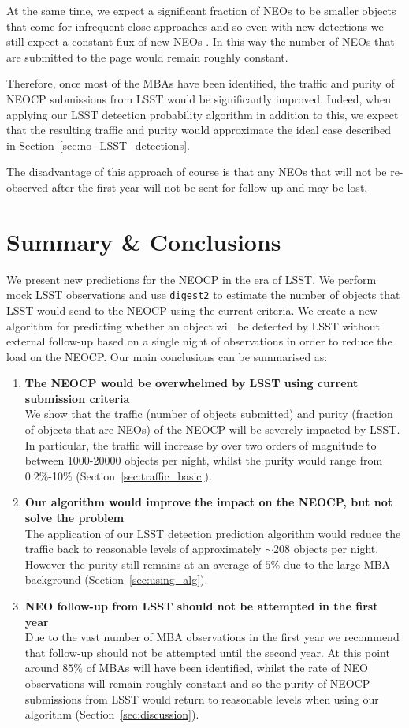 \documentclass[twocolumn]{aastex631}
\newcommand{\dig}{\texttt{digest2}}
\newcommand{\npernightAlg}{208}
\newcommand{\purityAlg}{5}
\begin{document}
At the same time, we expect a significant fraction of NEOs to be smaller objects that come for infrequent close approaches and so even with new detections we still expect a constant flux of new NEOs \citep{Juric+2020}. In this way the number of NEOs that are submitted to the page would remain roughly constant.

Therefore, once most of the MBAs have been identified, the traffic and purity of NEOCP submissions from LSST would be significantly improved. Indeed, when applying our LSST detection probability algorithm in addition to this, we expect that the resulting traffic and purity would approximate the ideal case described in Section~\ref{sec:no_LSST_detections}.

The disadvantage of this approach of course is that any NEOs that will not be re-observed after the first year will not be sent for follow-up and may be lost.

\section{Summary \& Conclusions} \label{sec:conclusion}
We present new predictions for the NEOCP in the era of LSST. We perform mock LSST observations and use \dig{} to estimate the number of objects that LSST would send to the NEOCP using the current criteria. We create a new algorithm for predicting whether an object will be detected by LSST without external follow-up based on a single night of observations in order to reduce the load on the NEOCP. Our main conclusions can be summarised as:

\begin{enumerate}
    \item \textbf{The NEOCP would be overwhelmed by LSST using current submission criteria}\\We show that the traffic (number of objects submitted) and purity (fraction of objects that are NEOs) of the NEOCP will be severely impacted by LSST. In particular, the traffic will increase by over two orders of magnitude to between 1000-20000 objects per night, whilst the purity would range from 0.2\%-10\% (Section~\ref{sec:traffic_basic}).
    \item \textbf{Our algorithm would improve the impact on the NEOCP, but not solve the problem}\\The application of our LSST detection prediction algorithm would reduce the traffic back to reasonable levels of approximately ${\sim}\npernightAlg{}$ objects per night. However the purity still remains at an average of $\purityAlg{}\%$ due to the large MBA background (Section~\ref{sec:using_alg}).
    \item \textbf{NEO follow-up from LSST should not be attempted in the first year}\\Due to the vast number of MBA observations in the first year we recommend that follow-up should not be attempted until the second year. At this point around $85\%$ of MBAs will have been identified, whilst the rate of NEO observations will remain roughly constant and so the purity of NEOCP submissions from LSST would return to reasonable levels when using our algorithm (Section~\ref{sec:discussion}).
\end{enumerate}
\end{document}
